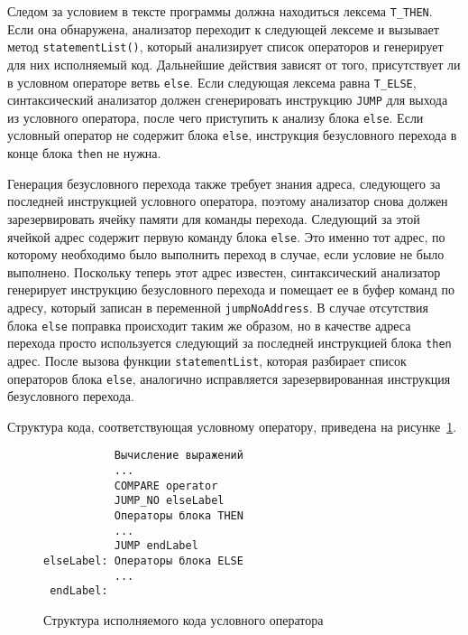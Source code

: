\documentclass[a4paper,12pt]{article}
\begin{document}
Следом за условием в тексте программы должна находиться лексема
\texttt{T\_THEN}. Если она обнаружена, анализатор переходит к следующей лексеме
и вызывает метод \texttt{statementList()}, который анализирует список операторов
и генерирует для них исполняемый код. Дальнейшие действия зависят от того,
присутствует ли в условном операторе ветвь \texttt{else}. Если следующая лексема
равна \texttt{T\_ELSE}, синтаксический анализатор должен сгенерировать
инструкцию \texttt{JUMP} для выхода из условного оператора, после чего
приступить к анализу блока \texttt{else}. Если условный оператор не содержит
блока \texttt{else}, инструкция безусловного перехода в конце блока
\texttt{then} не нужна.

Генерация безусловного перехода также требует знания адреса, следующего за
последней инструкцией условного оператора, поэтому анализатор снова должен
зарезервировать ячейку памяти для команды перехода. Следующий за этой ячейкой
адрес содержит первую команду блока \texttt{else}. Это именно тот адрес, по
которому необходимо было выполнить переход в случае, если условие не было
выполнено. Поскольку теперь этот адрес известен, синтаксический анализатор
генерирует инструкцию безусловного перехода и помещает ее в буфер команд по
адресу, который записан в переменной \texttt{jumpNoAddress}. В случае отсутствия
блока \texttt{else} поправка происходит таким же образом, но в качестве адреса
перехода просто используется следующий за последней инструкцией блока
\texttt{then} адрес. После вызова функции \texttt{statementList}, которая
разбирает список операторов блока \texttt{else}, аналогично исправляется
зарезервированная инструкция безусловного перехода.

Структура кода, соответствующая условному оператору, приведена на
рисунке~\ref{ifthenelse-code}.

\begin{figure}
\begin{verbatim}
           Вычисление выражений
           ...
           COMPARE operator
           JUMP_NO elseLabel
           Операторы блока THEN
           ...
           JUMP endLabel
elseLabel: Операторы блока ELSE
           ...
 endLabel:
\end{verbatim}
\caption{Структура исполняемого кода условного оператора}
\label{ifthenelse-code}
\end{figure}
\end{document}
